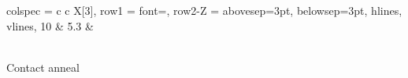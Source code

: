 \documentclass{article}
\begin{document}
\begin{longtblr}{
    colspec = {c c X[3]},
    row{1} = {font=\bfseries},
    row{2-Z} = {abovesep=3pt, belowsep=3pt},
    hlines,
    vlines,
}
10 & 5.3 &
\begin{minipage}{\linewidth}
    \centering
    \\[2pt]
    Contact anneal
\end{minipage} \\

\end{longtblr}
\end{document}
